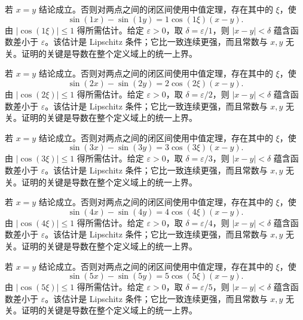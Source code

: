 \documentclass[12pt,fontset=fandol]{ctexart}
\begin{document}
\begin{solve}\label{ans:c10q8}
若 $x=y$ 结论成立。否则对两点之间的闭区间使用中值定理，存在其中的 $\xi$，使
\[
\sin(1x)-\sin(1y)=1\cos(1\xi)(x-y).
\]
由 $|\cos(1\xi)|\le1$ 得所需估计。给定 $\varepsilon>0$，取 $\delta=\varepsilon/1$，则 $|x-y|<\delta$ 蕴含函数差小于 $\varepsilon$。该估计是 Lipschitz 条件；它比一致连续更强，而且常数与 $x,y$ 无关。证明的关键是导数在整个定义域上的统一上界。
\end{solve}

\begin{solve}\label{ans:c10q9}
若 $x=y$ 结论成立。否则对两点之间的闭区间使用中值定理，存在其中的 $\xi$，使
\[
\sin(2x)-\sin(2y)=2\cos(2\xi)(x-y).
\]
由 $|\cos(2\xi)|\le1$ 得所需估计。给定 $\varepsilon>0$，取 $\delta=\varepsilon/2$，则 $|x-y|<\delta$ 蕴含函数差小于 $\varepsilon$。该估计是 Lipschitz 条件；它比一致连续更强，而且常数与 $x,y$ 无关。证明的关键是导数在整个定义域上的统一上界。
\end{solve}

\begin{solve}\label{ans:c10q10}
若 $x=y$ 结论成立。否则对两点之间的闭区间使用中值定理，存在其中的 $\xi$，使
\[
\sin(3x)-\sin(3y)=3\cos(3\xi)(x-y).
\]
由 $|\cos(3\xi)|\le1$ 得所需估计。给定 $\varepsilon>0$，取 $\delta=\varepsilon/3$，则 $|x-y|<\delta$ 蕴含函数差小于 $\varepsilon$。该估计是 Lipschitz 条件；它比一致连续更强，而且常数与 $x,y$ 无关。证明的关键是导数在整个定义域上的统一上界。
\end{solve}

\begin{solve}\label{ans:c10q11}
若 $x=y$ 结论成立。否则对两点之间的闭区间使用中值定理，存在其中的 $\xi$，使
\[
\sin(4x)-\sin(4y)=4\cos(4\xi)(x-y).
\]
由 $|\cos(4\xi)|\le1$ 得所需估计。给定 $\varepsilon>0$，取 $\delta=\varepsilon/4$，则 $|x-y|<\delta$ 蕴含函数差小于 $\varepsilon$。该估计是 Lipschitz 条件；它比一致连续更强，而且常数与 $x,y$ 无关。证明的关键是导数在整个定义域上的统一上界。
\end{solve}

\begin{solve}\label{ans:c10q12}
若 $x=y$ 结论成立。否则对两点之间的闭区间使用中值定理，存在其中的 $\xi$，使
\[
\sin(5x)-\sin(5y)=5\cos(5\xi)(x-y).
\]
由 $|\cos(5\xi)|\le1$ 得所需估计。给定 $\varepsilon>0$，取 $\delta=\varepsilon/5$，则 $|x-y|<\delta$ 蕴含函数差小于 $\varepsilon$。该估计是 Lipschitz 条件；它比一致连续更强，而且常数与 $x,y$ 无关。证明的关键是导数在整个定义域上的统一上界。
\end{solve}
\end{document}
